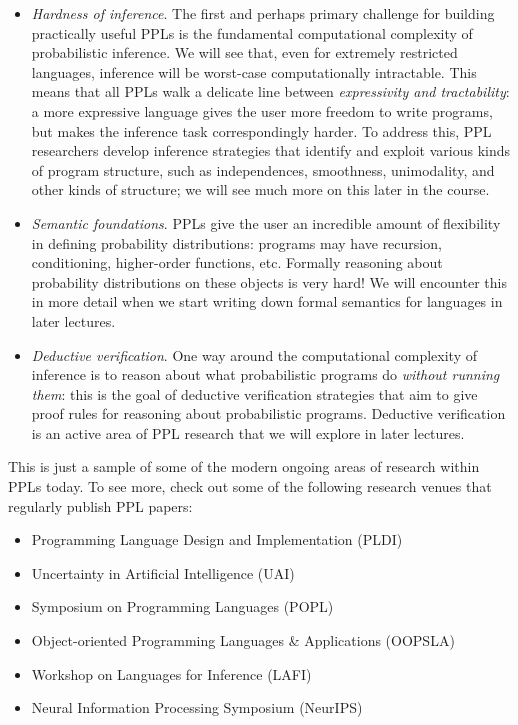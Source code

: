 \documentclass{../tufte-handout}
\begin{document}
\begin{itemize}
  \item \emph{Hardness of inference}. The first and perhaps primary challenge
  for building practically useful PPLs is the fundamental computational
  complexity of probabilistic inference. We will see that, even for extremely 
  restricted languages, inference will be worst-case computationally intractable. 
  This means that all PPLs walk a delicate line between \emph{expressivity and
  tractability}: a more expressive language gives the user more freedom to write 
  programs, but makes the inference task correspondingly harder. To address this,
  PPL researchers develop inference strategies that identify and exploit various kinds 
  of program structure, such as independences, smoothness, unimodality, and other kinds of
  structure; we will see much more on this later in the course.

  \item \emph{Semantic foundations}. PPLs give the user an incredible amount of 
  flexibility in defining probability distributions: programs may have recursion, 
  conditioning, higher-order functions, etc. Formally reasoning about probability 
  distributions on these objects is very hard! We will encounter this in more detail 
  when we start writing down formal semantics for languages in later lectures.

  \item \emph{Deductive verification}. One way around the computational complexity 
  of inference is to reason about what probabilistic 
  programs do \emph{without running them}: this is the goal of deductive verification 
  strategies that aim to give proof rules for reasoning about probabilistic 
  programs. Deductive verification is an active area of PPL research that we will 
  explore in later lectures.
\end{itemize}

This is just a sample of some of the modern ongoing areas of research within PPLs 
today. To see more, check out some of the following research venues that regularly 
publish PPL papers:
\begin{itemize}
  \item Programming Language Design and Implementation (PLDI)
  \item Uncertainty in Artificial Intelligence (UAI)
  \item Symposium on Programming Languages (POPL)
  \item Object-oriented Programming Languages \& Applications (OOPSLA)
  \item Workshop on Languages for Inference (LAFI)
  \item Neural Information Processing Symposium (NeurIPS)
\end{itemize}



\end{document}
